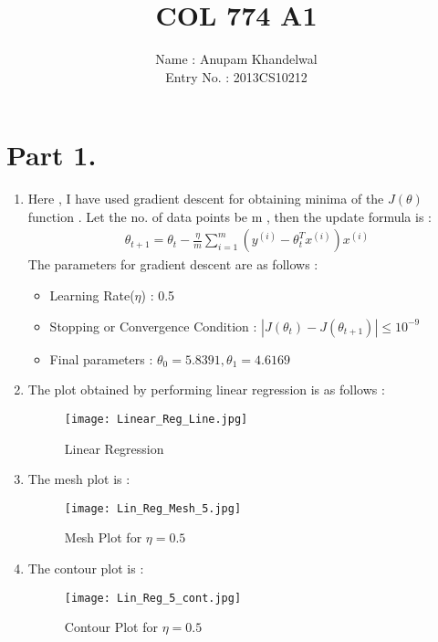 \documentclass{article}
\title{COL 774 A1}
\author{Name : Anupam Khandelwal\\
        Entry No. : 2013CS10212}
\begin{document}
\maketitle

\section{Part 1.}
\begin{enumerate}[label=(\alph*)]
    \item Here , I have used gradient descent for obtaining minima of the $J(\theta)$ function . Let the no. of data points be m , then  the update formula is :\\
        \begin{align*}
        \theta _{t+1} = \theta _t - \frac{\eta}{m} \sum_{i=1}^{m} (y^{(i)} - \theta ^T_t x^{(i)})x^{(i)}
        \end{align*}
        The parameters for gradient descent are as follows : 
        \begin{itemize}
            \item Learning Rate($\eta$) : 0.5
            \item Stopping or Convergence Condition : $|J(\theta _t)- J(\theta _{t+1})| \leq 10^{-9}$
            \item Final parameters : $ \theta _0 = 5.8391 , \theta _1 = 4.6169 $
        \end{itemize}
    \item The plot obtained by performing linear regression is as follows :\\ 
 
        \begin{figure}[H]
            \centering
            \texttt{[image: Linear\_Reg\_Line.jpg]}
            \caption{Linear Regression}
            \label{Linear_Reg_Line}
         \end{figure}

        
    \item The mesh plot is :
        \begin{figure}[H]
            \centering
            \texttt{[image: Lin\_Reg\_Mesh\_5.jpg]}
            \caption{Mesh Plot for $\eta = 0.5$}
            \label{Linear_Reg_Line}
         \end{figure}
    
    \item The contour plot is :
         \begin{figure}[H]
            \centering
            \texttt{[image: Lin\_Reg\_5\_cont.jpg]}
            \caption{Contour Plot for $\eta = 0.5$}
            \label{Linear_Reg_Line}
         \end{figure}
    

\end{enumerate}
\end{document}

